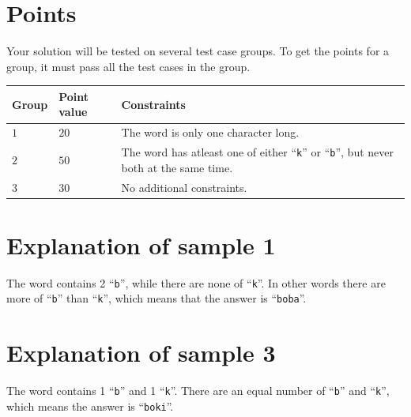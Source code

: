 \section*{Points}
Your solution will be tested on several test case groups.
To get the points for a group, it must pass all the test cases in the group.

\noindent
\begin{tabular}{| l | l | p{12cm} |}
  \hline
  \textbf{Group} & \textbf{Point value} & \textbf{Constraints} \\ \hline
  $1$    & $20$       & The word is only one character long. \\ \hline
  $2$    & $50$       & The word has atleast one of either ``\texttt{k}'' or ``\texttt{b}'', but never both at the same time. \\ \hline
  $3$    & $30$       & No additional constraints. \\ \hline
\end{tabular}

\section*{Explanation of sample 1}
The word contains 2 ``\texttt{b}'', while there are none of ``\texttt{k}''. In other words there are more of ``\texttt{b}'' than ``\texttt{k}'', which means that the answer is ``\texttt{boba}''.

\section*{Explanation of sample 3}
The word contains 1 ``\texttt{b}'' and 1 ``\texttt{k}''. There are an equal number of ``\texttt{b}'' and ``\texttt{k}'', which means the answer is ``\texttt{boki}''.
